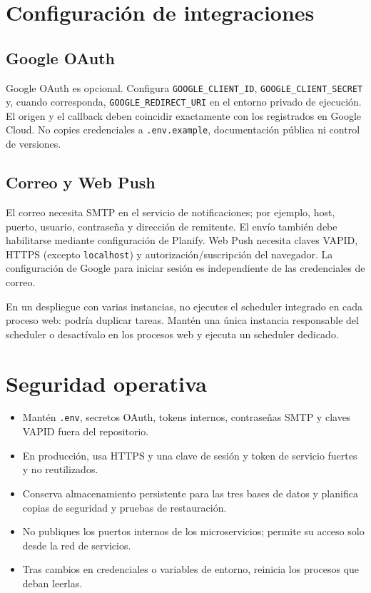 \documentclass[12pt,a4paper]{article}
\begin{document}
\section{Configuración de integraciones}
\subsection{Google OAuth}
Google OAuth es opcional. Configura \texttt{GOOGLE\_CLIENT\_ID}, \texttt{GOOGLE\_CLIENT\_SECRET} y, cuando corresponda, \texttt{GOOGLE\_REDIRECT\_URI} en el entorno privado de ejecución. El origen y el callback deben coincidir exactamente con los registrados en Google Cloud. No copies credenciales a \texttt{.env.example}, documentación pública ni control de versiones.

\subsection{Correo y Web Push}
El correo necesita SMTP en el servicio de notificaciones; por ejemplo, host, puerto, usuario, contraseña y dirección de remitente. El envío también debe habilitarse mediante configuración de Planify. Web Push necesita claves VAPID, HTTPS (excepto \texttt{localhost}) y autorización/suscripción del navegador. La configuración de Google para iniciar sesión es independiente de las credenciales de correo.

En un despliegue con varias instancias, no ejecutes el scheduler integrado en cada proceso web: podría duplicar tareas. Mantén una única instancia responsable del scheduler o desactívalo en los procesos web y ejecuta un scheduler dedicado.

\section{Seguridad operativa}
\begin{itemize}
  \item Mantén \texttt{.env}, secretos OAuth, tokens internos, contraseñas SMTP y claves VAPID fuera del repositorio.
  \item En producción, usa HTTPS y una clave de sesión y token de servicio fuertes y no reutilizados.
  \item Conserva almacenamiento persistente para las tres bases de datos y planifica copias de seguridad y pruebas de restauración.
  \item No publiques los puertos internos de los microservicios; permite su acceso solo desde la red de servicios.
  \item Tras cambios en credenciales o variables de entorno, reinicia los procesos que deban leerlas.
\end{itemize}
\end{document}

